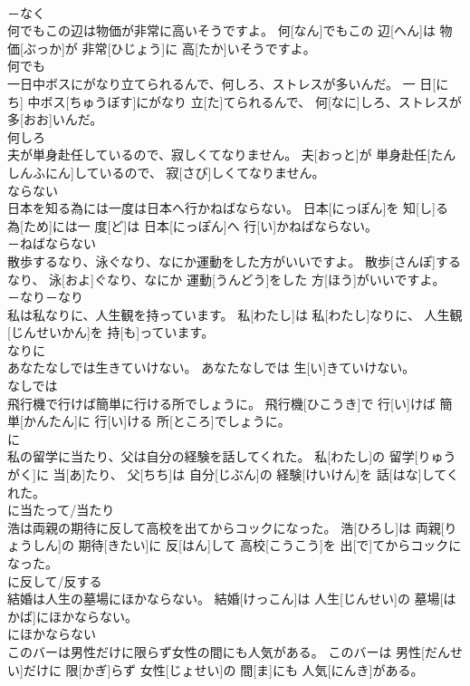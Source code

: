 \documentclass[8pt]{extreport}
\begin{document}
\begin{CJK}{UTF8}{min}
\\	－なく	
\\	何でもこの辺は物価が非常に高いそうですよ。	何[なん]でもこの 辺[へん]は 物価[ぶっか]が 非常[ひじょう]に 高[たか]いそうですよ。	
\\	何でも	
\\	一日中ボスにがなり立てられるんで、何しろ、ストレスが多いんだ。	一 日[にち] 中ボス[ちゅうぼす]にがなり 立[た]てられるんで、 何[なに]しろ、ストレスが 多[おお]いんだ。	
\\	何しろ	
\\	夫が単身赴任しているので、寂しくてなりません。	夫[おっと]が 単身赴任[たんしんふにん]しているので、 寂[さび]しくてなりません。	
\\	ならない	
\\	日本を知る為には一度は日本へ行かねばならない。	日本[にっぽん]を 知[し]る 為[ため]には一 度[ど]は 日本[にっぽん]へ 行[い]かねばならない。	
\\	－ねばならない	
\\	散歩するなり、泳ぐなり、なにか運動をした方がいいですよ。	散歩[さんぽ]するなり、 泳[およ]ぐなり、なにか 運動[うんどう]をした 方[ほう]がいいですよ。	
\\	－なり－なり	
\\	私は私なりに、人生観を持っています。	私[わたし]は 私[わたし]なりに、 人生観[じんせいかん]を 持[も]っています。	
\\	なりに	
\\	あなたなしでは生きていけない。	あなたなしでは 生[い]きていけない。	
\\	なしでは	
\\	飛行機で行けば簡単に行ける所でしょうに。	飛行機[ひこうき]で 行[い]けば 簡単[かんたん]に 行[い]ける 所[ところ]でしょうに。	
\\	に	
\\	私の留学に当たり、父は自分の経験を話してくれた。	私[わたし]の 留学[りゅうがく]に 当[あ]たり、 父[ちち]は 自分[じぶん]の 経験[けいけん]を 話[はな]してくれた。	
\\	に当たって/当たり	
\\	浩は両親の期待に反して高校を出てからコックになった。	浩[ひろし]は 両親[りょうしん]の 期待[きたい]に 反[はん]して 高校[こうこう]を 出[で]てからコックになった。	
\\	に反して/反する	
\\	結婚は人生の墓場にほかならない。	結婚[けっこん]は 人生[じんせい]の 墓場[はかば]にほかならない。	
\\	にほかならない	
\\	このバーは男性だけに限らず女性の間にも人気がある。	このバーは 男性[だんせい]だけに 限[かぎ]らず 女性[じょせい]の 間[ま]にも 人気[にんき]がある。	

\end{CJK}
\end{document}
